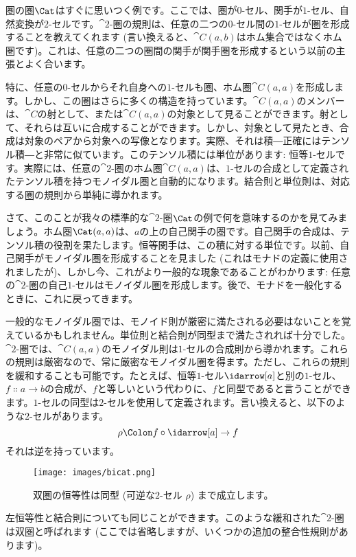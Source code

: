 \noindent
圏の圏$\Cat$はすぐに思いつく例です。ここでは、圏が$0$-セル、関手が$1$-セル、自然変換が$2$-セルです。$\cat{2}$-圏の規則は、任意の二つの$0$-セル間の$1$-セルが圏を形成することを教えてくれます (言い換えると、$\cat{C}(a, b)$はホム集合ではなくホム圏です)。これは、任意の二つの圏間の関手が関手圏を形成するという以前の主張とよく合います。

特に、任意の$0$-セルからそれ自身への$1$-セルも圏、ホム圏$\cat{C}(a, a)$を形成します。しかし、この圏はさらに多くの構造を持っています。$\cat{C}(a, a)$のメンバーは、$\cat{C}$の射として、または$\cat{C}(a, a)$の対象として見ることができます。射として、それらは互いに合成することができます。しかし、対象として見たとき、合成は対象のペアから対象への写像となります。実際、それは積―正確にはテンソル積―と非常に似ています。このテンソル積には単位があります: 恒等$1$-セルです。実際には、任意の$\cat{2}$-圏のホム圏$\cat{C}(a, a)$は、$1$-セルの合成として定義されたテンソル積を持つモノイダル圏と自動的になります。結合則と単位則は、対応する圏の規則から単純に導かれます。

さて、このことが我々の標準的な$\cat{2}$-圏$\Cat$の例で何を意味するのかを見てみましょう。ホム圏$\Cat(a, a)$は、$a$の上の自己関手の圏です。自己関手の合成は、テンソル積の役割を果たします。恒等関手は、この積に対する単位です。以前、自己関手がモノイダル圏を形成することを見ました (これはモナドの定義に使用されましたが)、しかし今、これがより一般的な現象であることがわかります: 任意の$\cat{2}$-圏の自己$1$-セルはモノイダル圏を形成します。後で、モナドを一般化するときに、これに戻ってきます。

一般的なモノイダル圏では、モノイド則が厳密に満たされる必要はないことを覚えているかもしれません。単位則と結合則が同型まで満たされれば十分でした。$\cat{2}$-圏では、$\cat{C}(a, a)$のモノイダル則は$1$-セルの合成則から導かれます。これらの規則は厳密なので、常に厳密なモノイダル圏を得ます。ただし、これらの規則を緩和することも可能です。たとえば、恒等$1$-セル$\idarrow[a]$と別の$1$-セル、$f \Colon a \to b$の合成が、$f$と等しいという代わりに、$f$と同型であると言うことができます。$1$-セルの同型は$2$-セルを使用して定義されます。言い換えると、以下のような$2$-セルがあります。
\[\rho \Colon f \circ \idarrow[a] \to f\]
それは逆を持っています。

\begin{figure}[H]
  \centering
  \texttt{[image: images/bicat.png]}
  \caption{双圏の恒等性は同型 (可逆な$2$-セル $\rho$) まで成立します。}
\end{figure}

\noindent
左恒等性と結合則についても同じことができます。このような緩和された$\cat{2}$-圏は双圏と呼ばれます (ここでは省略しますが、いくつかの追加の整合性規則があります)。

